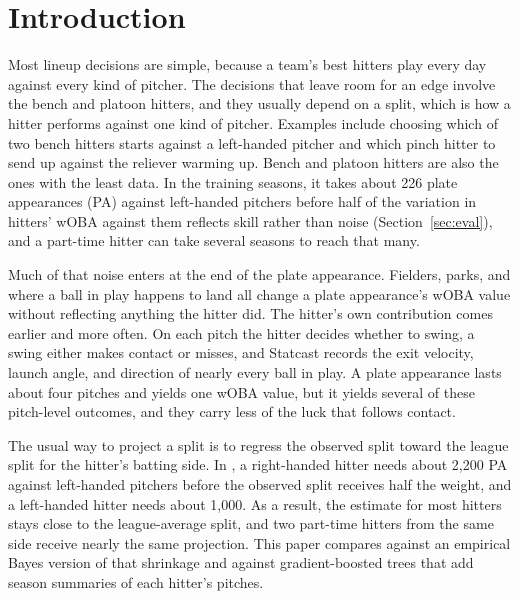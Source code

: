 \documentclass[11pt,letterpaper]{article}
\begin{document}
\section{Introduction}
\label{sec:intro}

Most lineup decisions are simple, because a team's best hitters play every day against every kind of pitcher. The decisions that leave room for an edge involve the bench and platoon hitters, and they usually depend on a split, which is how a hitter performs against one kind of pitcher. Examples include choosing which of two bench hitters starts against a left-handed pitcher and which pinch hitter to send up against the reliever warming up. Bench and platoon hitters are also the ones with the least data. In the training seasons, it takes about 226 plate appearances (PA) against left-handed pitchers before half of the variation in hitters' wOBA against them reflects skill rather than noise (Section~\ref{sec:eval}), and a part-time hitter can take several seasons to reach that many.

Much of that noise enters at the end of the plate appearance. Fielders, parks, and where a ball in play happens to land all change a plate appearance's wOBA value without reflecting anything the hitter did. The hitter's own contribution comes earlier and more often. On each pitch the hitter decides whether to swing, a swing either makes contact or misses, and Statcast records the exit velocity, launch angle, and direction of nearly every ball in play. A plate appearance lasts about four pitches and yields one wOBA value, but it yields several of these pitch-level outcomes, and they carry less of the luck that follows contact.

The usual way to project a split is to regress the observed split toward the league split for the hitter's batting side. In \citet[p.~157]{tango2007}, a right-handed hitter needs about 2,200 PA against left-handed pitchers before the observed split receives half the weight, and a left-handed hitter needs about 1,000. As a result, the estimate for most hitters stays close to the league-average split, and two part-time hitters from the same side receive nearly the same projection. This paper compares against an empirical Bayes version of that shrinkage \citep{efron1975} and against gradient-boosted trees \citep{chen2016} that add season summaries of each hitter's pitches.
\end{document}
